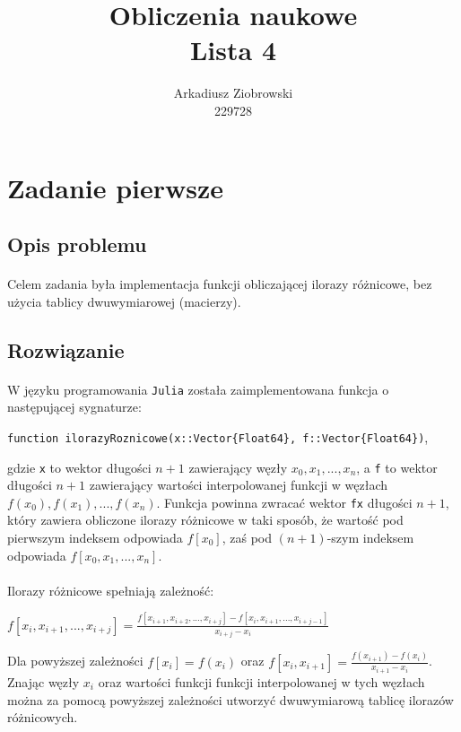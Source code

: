\documentclass[a4paper]{article}
\title{\huge
  Obliczenia naukowe \\
  \large Lista 4}
\author{Arkadiusz Ziobrowski \\ 229728}
\date{}
\theoremstyle{plain}
\begin{document}
\maketitle

\pagebreak




\section{Zadanie pierwsze}

\subsection{Opis problemu}
\paragraph{}
Celem zadania była implementacja funkcji obliczającej ilorazy różnicowe, bez użycia tablicy dwuwymiarowej (macierzy).
\subsection{Rozwiązanie}
\paragraph{}
W języku programowania \texttt{Julia} została zaimplementowana funkcja o następującej sygnaturze:
\begin{center}
\texttt{function ilorazyRoznicowe(x::Vector\{Float64\}, f::Vector\{Float64\})},
\end{center}

gdzie \texttt{x} to wektor długości $n + 1$ zawierający węzły $x_{0}, x_{1}, ..., x_{n}$, a \texttt{f} to wektor długości $n + 1$ zawierający wartości interpolowanej funkcji w węzłach $f(x_{0}), f(x_{1}), ..., f(x_{n})$. Funkcja powinna zwracać wektor \texttt{fx} długości $n + 1$, który zawiera obliczone ilorazy różnicowe w taki sposób, że wartość pod pierwszym indeksem odpowiada $f[x_{0}]$, zaś pod $(n + 1)$-szym indeksem odpowiada $f[x_{0}, x_{1}, ..., x_{n}]$.

\paragraph{}
Ilorazy różnicowe spełniają zależność:
\begin{center}
\large
$f[x_{i}, x_{i + 1}, ..., x_{i + j}] = \frac{f[x_{i + 1}, x_{i + 2}, ...,x_{i + j}] - f[x_{i}, x_{i + 1}, ..., x_{i + j - 1}]}{x_{i + j} - x_{i}}$
\end{center}
Dla powyższej zależności $f[x_{i}] = f(x_{i})$ oraz $f[x_{i}, x_{i+1}] = \frac{f(x_{i + 1}) - f(x_{i})}{x_{i + 1} - x_{i}}$. Znając węzły $x_{i}$ oraz wartości funkcji funkcji interpolowanej w tych węzłach można za pomocą powyższej zależności utworzyć dwuwymiarową tablicę ilorazów różnicowych.
\end{document}
